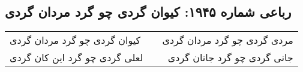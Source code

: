 \begin{center}
\section*{رباعی شماره ۱۹۴۵: کیوان گردی چو گرد مردان گردی}
\label{sec:1945}
\begin{longtable}{l p{0.5cm} r}
کیوان گردی چو گرد مردان گردی
&&
مردی گردی چو گرد مردان گردی
\\
لعلی گردی چو گرد این کان گردی
&&
جانی گردی چو گرد جانان گردی
\\
\end{longtable}
\end{center}

